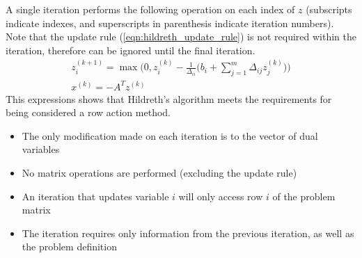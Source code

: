 A single iteration performs the following operation on each index of $z$ (subscripts indicate indexes, and superscripts in parenthesis indicate iteration numbers). Note that the update rule (\ref{eqn:hildreth_update_rule}) is not required within the iteration, therefore can be ignored until the final iteration.
\begin{subequations}
\begin{gather}
z_i^{(k+1)} = \max\Big(0,z_i^{(k)}-\frac{1}{\Delta_{ii}}\big(b_i + \sum^m_{j=1}\Delta_{ij}z_j^{(k)}\big)\Big)\label{eqn:hildreth_iteration}\\
x^{(k)}= -A^Tz^{(k)}\label{eqn:hildreth_update_rule}
\end{gather}
\end{subequations}
This expressions shows that Hildreth's algorithm meets the requirements for being considered a row action method. 
\begin{itemize}
    \item The only modification made on each iteration is to the vector of dual variables
    \item No matrix operations are performed (excluding the update rule)
    \item An iteration that updates variable $i$ will only access row $i$ of the problem matrix
    \item The iteration requires only information from the previous iteration, as well as the problem definition
\end{itemize}

